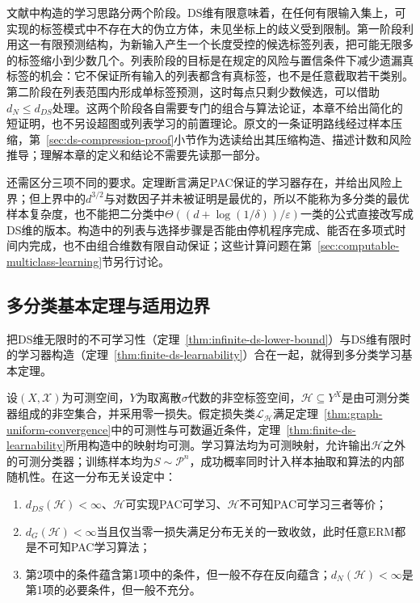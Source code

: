 文献中构造的学习思路分两个阶段。DS维有限意味着，在任何有限输入集上，可实现的标签模式中不存在大的伪立方体，未见坐标上的歧义受到限制。第一阶段利用这一有限预测结构，为新输入产生一个长度受控的候选标签列表，把可能无限多的标签缩小到少数几个。列表阶段的目标是在规定的风险与置信条件下减少遗漏真标签的机会：它不保证所有输入的列表都含有真标签，也不是任意截取若干类别。第二阶段在列表范围内形成单标签预测，这时每点只剩少数候选，可以借助$d_N\leq d_{DS}$处理。这两个阶段各自需要专门的组合与算法论证，本章不给出简化的短证明，也不另设超图或列表学习的前置理论。原文的一条证明路线经过样本压缩，第~\ref{sec:ds-compression-proof}小节作为选读给出其压缩构造、描述计数和风险推导；理解本章的定义和结论不需要先读那一部分。

还需区分三项不同的要求。定理断言满足PAC保证的学习器存在，并给出风险上界；但上界中的$d^{3/2}$与对数因子并未被证明是最优的，所以不能称为多分类的最优样本复杂度，也不能把二分类中$\Theta((d+\log(1/\delta))/\varepsilon)$一类的公式直接改写成DS维的版本。构造中的列表与选择步骤是否能由停机程序完成、能否在多项式时间内完成，也不由组合维数有限自动保证；这些计算问题在第~\ref{sec:computable-multiclass-learning}节另行讨论。

\subsection{多分类基本定理与适用边界}
\label{sec:lt6-multiclass-fundamental}

把DS维无限时的不可学习性（定理~\ref{thm:infinite-ds-lower-bound}）与DS维有限时的学习器构造（定理~\ref{thm:finite-ds-learnability}）合在一起，就得到多分类学习基本定理。

\begin{theorem}[多分类学习基本定理]
\label{thm:multiclass-fundamental-theorem}
\label{thm:ds-characterization}
设$(X,\mathcal X)$为可测空间，$Y$为取离散$\sigma$代数的非空标签空间，$\mathcal H\subseteq Y^X$是由可测分类器组成的非空集合，并采用零一损失。假定损失类$\mathcal L_{\mathcal H}$满足定理~\ref{thm:graph-uniform-convergence}中的可测性与可数逼近条件，定理~\ref{thm:finite-ds-learnability}所用构造中的映射均可测。学习算法均为可测映射，允许输出$\mathcal H$之外的可测分类器；训练样本均为$S\sim\mathcal P^n$，成功概率同时计入样本抽取和算法的内部随机性。在这一分布无关设定中：
\begin{enumerate}
 \item $d_{DS}(\mathcal H)<\infty$、$\mathcal H$可实现PAC可学习、$\mathcal H$不可知PAC可学习三者等价；
 \item $d_G(\mathcal H)<\infty$当且仅当零一损失满足分布无关的一致收敛，此时任意ERM都是不可知PAC学习算法；
 \item 第2项中的条件蕴含第1项中的条件，但一般不存在反向蕴含；$d_N(\mathcal H)<\infty$是第1项的必要条件，但一般不充分。
\end{enumerate}
\end{theorem}

